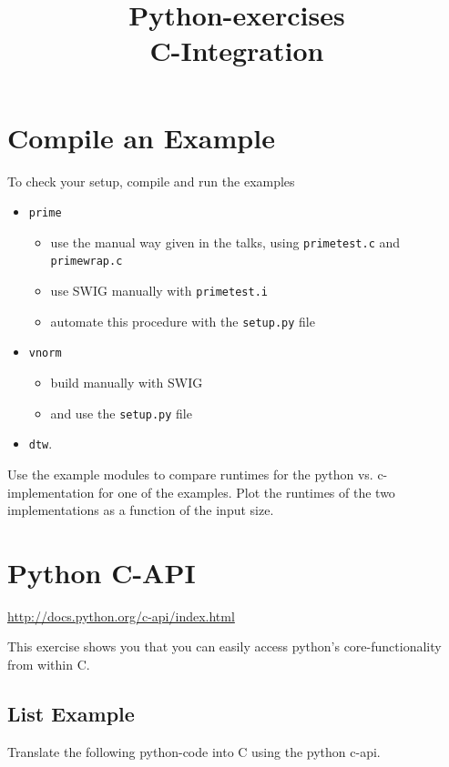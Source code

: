\documentclass[12pt]{scrartcl}
\title{Python-exercises\\ C-Integration}
\begin{document}
\parindent0cm

\maketitle

\section{Compile an Example}

To check your setup, compile and run the examples 
\begin{itemize}
\item {\tt prime}
  \begin{itemize}
  \item use the manual way given in the talks, using {\tt primetest.c}
    and {\tt primewrap.c}
  \item use SWIG manually with {\tt primetest.i}
  \item automate this procedure with the {\tt setup.py} file
  \end{itemize}
\item {\tt vnorm}
  \begin{itemize}
  \item build manually with SWIG
  \item and use the {\tt setup.py} file
  \end{itemize}
\item {\tt dtw}.
\end{itemize}

Use the example modules to compare runtimes for the python
vs. c-implementation for one of the examples. Plot the runtimes of the
two implementations as a function of the input size.

\section{Python C-API}

\url{http://docs.python.org/c-api/index.html}

This exercise shows you that you can easily access python's
core-functionality from within C.

\subsection{List Example}
Translate the following python-code into C using the python c-api.


\end{document}
